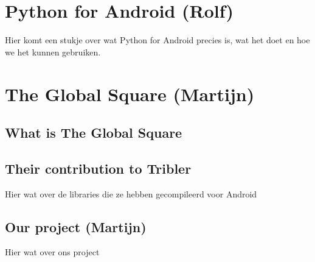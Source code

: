 \documentclass[11pt]{article}
\begin{document}
\section{Python for Android (Rolf)}
Hier komt een stukje over wat Python for Android precies is, wat het doet en hoe we het kunnen gebruiken.

\section{The Global Square (Martijn)}

\subsection{What is The Global Square}

\subsection{Their contribution to Tribler}
Hier wat over de libraries die ze hebben gecompileerd voor Android

\subsection{Our project (Martijn)}
Hier wat over ons project
\end{document}
